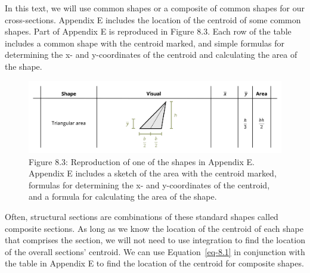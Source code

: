 \documentclass[
  letterpaper,
  DIV=11,
  numbers=noendperiod]{scrreprt}
\theoremstyle{definition}
\theoremstyle{remark}
\begin{document}
In this text, we will use common shapes or a composite of common shapes
for our cross-sections. Appendix E includes the location of the centroid
of some common shapes. Part of Appendix E is reproduced in Figure 8.3.
Each row of the table includes a common shape with the centroid marked,
and simple formulas for determining the x- and y-coordinates of the
centroid and calculating the area of the shape.

\begin{figure}[H]

{\centering \includegraphics{images/CH 8 PNGs/figure 8.3.png}

}

\caption{Figure 8.3: Reproduction of one of the shapes in Appendix E.
Appendix E includes a sketch of the area with the centroid marked,
formulas for determining the x- and y-coordinates of the centroid, and a
formula for calculating the area of the shape.}

\end{figure}%

Often, structural sections are combinations of these standard shapes
called composite sections. As long as we know the location of the
centroid of each shape that comprises the section, we will not need to
use integration to find the location of the overall sections' centroid.
We can use Equation~\ref{eq-8.1} in conjunction with the table in
Appendix E to find the location of the centroid for composite shapes.
\end{document}
